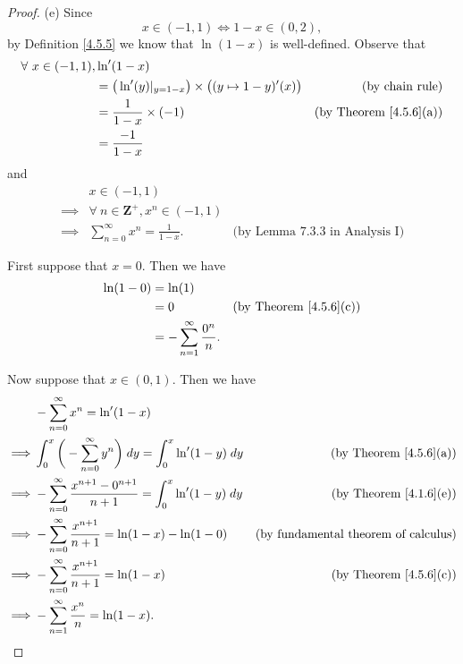 \begin{proof}{(e)}
    Since
    \[
        x \in (-1, 1) \iff 1 - x \in (0, 2),
    \]
    by Definition \ref{4.5.5} we know that \(\ln(1 - x)\) is well-defined.
    Observe that
    \begin{align*}
        \forall\ x \in (-1, 1), & \ln'(1 - x)                                                                                                  \\
                                & = \big(\ln'(y)|_{y = 1 - x}\big) \times \big((y \mapsto 1 - y)'(x)\big) & \text{(by chain rule)}             \\
                                & = \frac{1}{1 - x} \times (-1)                                           & \text{(by Theorem \ref{4.5.6}(a))} \\
                                & = \frac{-1}{1 - x}
    \end{align*}
    and
    \begin{align*}
                 & x \in (-1, 1)                                                                        \\
        \implies & \forall\ n \in \mathbf{Z}^+, x^n \in (-1, 1)                                         \\
        \implies & \sum_{n = 0}^\infty x^n = \frac{1}{1 - x}.   & \text{(by Lemma 7.3.3 in Analysis I)}
    \end{align*}

    First suppose that \(x = 0\).
    Then we have
    \begin{align*}
        \ln(1 - 0) & = \ln(1)                                                                    \\
                   & = 0                                    & \text{(by Theorem \ref{4.5.6}(c))} \\
                   & = - \sum_{n = 1}^\infty \frac{0^n}{n}.
    \end{align*}

    Now suppose that \(x \in (0, 1)\).
    Then we have
    \begin{align*}
                 & - \sum_{n = 0}^\infty x^n = \ln'(1 - x)                                                                                              \\
        \implies & \int_0^x \bigg(- \sum_{n = 0}^\infty y^n\bigg) \; dy = \int_0^x \ln'(1 - y) \; dy      & \text{(by Theorem \ref{4.5.6}(a))}          \\
        \implies & - \sum_{n = 0}^\infty \frac{x^{n + 1} - 0^{n + 1}}{n + 1} = \int_0^x \ln'(1 - y) \; dy & \text{(by Theorem \ref{4.1.6}(e))}          \\
        \implies & - \sum_{n = 0}^\infty \frac{x^{n + 1}}{n + 1} = \ln(1 - x) - \ln(1 - 0)                & \text{(by fundamental theorem of calculus)} \\
        \implies & - \sum_{n = 0}^\infty \frac{x^{n + 1}}{n + 1} = \ln(1 - x)                             & \text{(by Theorem \ref{4.5.6}(c))}          \\
        \implies & - \sum_{n = 1}^\infty \frac{x^n}{n} = \ln(1 - x).
    \end{align*}


\end{proof}
